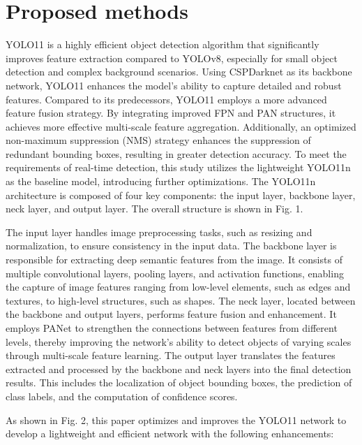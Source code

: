 \documentclass{article}
\begin{document}
\section*{Proposed methods}
YOLO11 is a highly efficient object detection algorithm that significantly improves feature extraction compared to YOLOv8, especially for small object detection and complex background scenarios. Using CSPDarknet as its backbone network, YOLO11 enhances the model's ability to capture detailed and robust features. Compared to its predecessors, YOLO11 employs a more advanced feature fusion strategy. By integrating improved FPN and PAN structures, it achieves more effective multi-scale feature aggregation. Additionally, an optimized non-maximum suppression (NMS) strategy enhances the suppression of redundant bounding boxes, resulting in greater detection accuracy. To meet the requirements of real-time detection, this study utilizes the lightweight YOLO11n as the baseline model, introducing further optimizations. The YOLO11n architecture is composed of four key components: the input layer, backbone layer, neck layer, and output layer. The overall structure is shown in Fig. 1.

The input layer handles image preprocessing tasks, such as resizing and normalization, to ensure consistency in the input data. The backbone layer is responsible for extracting deep semantic features from the image. It consists of multiple convolutional layers, pooling layers, and activation functions, enabling the capture of image features ranging from low-level elements, such as edges and textures, to high-level structures, such as shapes. The neck layer, located between the backbone and output layers, performs feature fusion and enhancement. It employs PANet to strengthen the connections between features from different levels, thereby improving the network's ability to detect objects of varying scales through multi-scale feature learning. The output layer translates the features extracted and processed by the backbone and neck layers into the final detection results. This includes the localization of object bounding boxes, the prediction of class labels, and the computation of confidence scores.

As shown in Fig. 2, this paper optimizes and improves the YOLO11 network to develop a lightweight and efficient network with the following enhancements:
\end{document}
